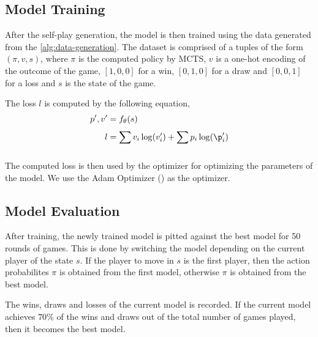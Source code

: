 \subsection{Model Training}

After the self-play generation, the model is then trained using the data generated from the \ref{alg:data-generation}. The dataset is comprised of a tuples of the form $(\pi, v, s)$, where $\pi$ is the computed policy by MCTS, $v$ is a one-hot encoding of the outcome of the game, $[1, 0, 0]$ for a win, $[0, 1, 0]$ for a draw and $[0, 0, 1]$ for a loss and $s$ is the state of the game.

The loss $l$ is computed by the following equation,
\begin{align}
  p', v' &= f_{\theta}(s) \\
  l &= \sum_{}^{} v_{i}\log(v_{i}') + \sum_{}^{}p_{i}\log(\p_{i}')
  \label{eq:loss}
\end{align}

The computed loss is then used by the optimizer for optimizing the parameters of the model. We use the Adam Optimizer (\cite{kingma2017adammethodstochasticoptimization}) as the optimizer. 

\subsection{Model Evaluation}

After training, the newly trained model is pitted against the best model for 50 rounds of games. This is done by switching the model depending on the current player of the state $s$. If the player to move in $s$ is the first player, then the action probabilites $\pi$ is obtained from the first model, otherwise $\pi$ is obtained from the best model.

The wins, draws and losses of the current model is recorded. If the current model achieves $70\%$ of the wins and draws out of the total number of games played, then it becomes the best model. 


